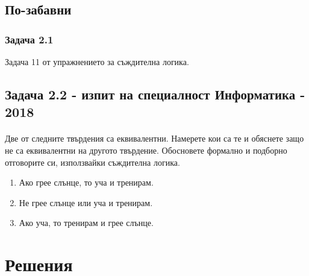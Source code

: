 \documentclass[12pt]{article}
\begin{document}
\subsection*{По-забавни}
\subsubsection*{Задача 2.1}
Задача 11 от упражнението за съждителна логика.
\subsection*{Задача 2.2 - изпит на специалност Информатика - 2018}
\paragraph*{}
Две от следните твърдения са еквивалентни. Намерете кои са те и обяснете защо не са еквивалентни на другото твърдение. Обосновете формално и подборно отговорите си, използвайки съждителна логика.
\begin{enumerate}
    \item Ако грее слънце, то уча и тренирам.
    \item Не грее слънце или уча и тренирам.
    \item Ако уча, то тренирам и грее слънце.
\end{enumerate}

\section*{Решения}
\end{document}
